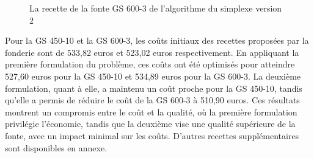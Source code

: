 \documentclass[12pt]{article}
\begin{document}
\begin{figure}[H]
    \centering
    \caption{La recette de la fonte GS 600-3 de l'algorithme du simplexe version 2}
    \label{fig:Recette6}
\end{figure}




Pour la GS 450-10 et la GS 600-3, les coûts initiaux des recettes 
proposées par la fonderie sont de 533,82 euros et 523,02 euros 
respectivement. En appliquant la première formulation du problème, 
ces coûts ont été optimisés pour atteindre 527,60 euros pour la GS 450-10 
et 534,89 euros pour la GS 600-3. La deuxième formulation, quant à elle, 
a maintenu un coût proche pour la GS 450-10, tandis qu'elle a permis de 
réduire le coût de la GS 600-3 à 510,90 euros.
Ces résultats montrent un compromis entre le coût et la qualité, où la 
première formulation privilégie l'économie, tandis que la deuxième vise 
une qualité supérieure de la fonte, avec un impact minimal sur les coûts.
D'autres recettes supplémentaires sont disponibles en annexe.
\end{document}
